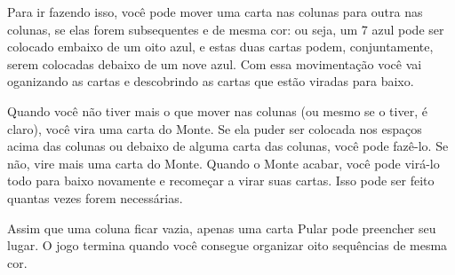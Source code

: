 Para ir fazendo isso, você pode mover uma carta nas colunas para outra nas colunas, se elas forem subsequentes e de mesma cor: ou seja, um 7 azul pode ser colocado embaixo de um oito azul, e estas duas cartas podem, conjuntamente, serem colocadas debaixo de um nove azul. Com essa movimentação você vai oganizando as cartas e descobrindo as cartas que estão viradas para baixo.

Quando você não tiver mais o que mover nas colunas (ou mesmo se o tiver, é claro), você vira uma carta do Monte. Se ela puder ser colocada nos espaços acima das colunas ou debaixo de alguma carta das colunas, você pode fazê-lo. Se não, vire mais uma carta do Monte. Quando o Monte acabar, você pode virá-lo todo para baixo novamente e recomeçar a virar suas cartas. Isso pode ser feito quantas vezes forem necessárias.

Assim que uma coluna ficar vazia, apenas uma carta Pular pode preencher seu lugar. O jogo termina quando você consegue organizar oito sequências de mesma cor.

 